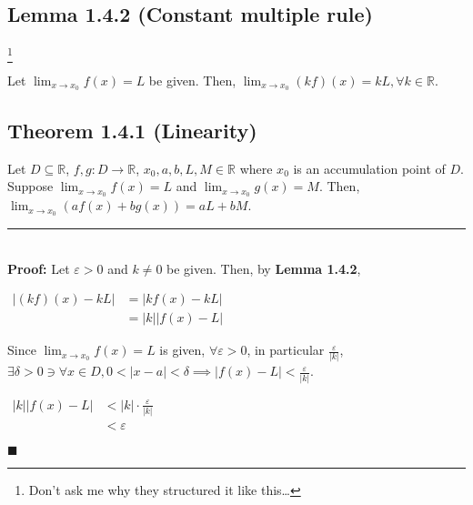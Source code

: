 \documentclass[11pt]{book}
\newcommand{\R}{\mathbb{R}}
\newcommand{\horline}{\noindent\rule{14.25cm}{0.6pt}\\}
\newcommand{\QED}{\begin{flushright}$\blacksquare$\end{flushright}}
\begin{document}
	\subsection{Lemma 1.4.2 (Constant multiple rule)}\footnote{Don't ask me why they structured it like this\dots}
		\begin{lemm}
			Let $\displaystyle\lim_{x \to x_0}{f(x) = L}$ be given. Then, $\displaystyle\lim_{x \to x_0}{(kf)(x) = kL}, \forall k \in \R$.
		\end{lemm}
	\subsection{Theorem 1.4.1 (Linearity)}
		\begin{theor}
			Let $D \subseteq \R$, $f,g: D \to \R$, $x_0, a, b, L, M \in \R$ where $x_0$ is an accumulation point of $D$. Suppose
			$\displaystyle\lim_{x \to x_0}{f(x) = L}$ and $\displaystyle\lim_{x \to x_0}{g(x) = M}$. Then,
			$\displaystyle\lim_{x \to x_0}{(af(x) + bg(x)) = aL + bM}$.\\
			\horline
			\textbf{Proof:} Let $\varepsilon > 0$ and $k \neq 0$ be given. Then, by \textbf{Lemma 1.4.2},
			\begin{center}
				\begin{math}
					\begin{aligned}
						|(kf)(x) -kL| & = |kf(x) - kL|\\
						& = |k||f(x) - L|
					\end{aligned}
				\end{math}
			\end{center}
			Since $\displaystyle\lim_{x \to x_0}{f(x) = L}$ is given, $\forall \varepsilon > 0$, in particular $\frac{\varepsilon}{|k|}$,
			$\exists \delta > 0 \ni \forall x \in D, 0 < |x-a| < \delta \implies |f(x) - L| < \frac{\varepsilon}{|k|}$.
			\begin{center}
				\begin{math}
					\begin{aligned}
						|k||f(x) - L| & < |k| \cdot \frac{\varepsilon}{|k|}\\
						& < \varepsilon
					\end{aligned}
				\end{math}
			\end{center}
			\QED
		\end{theor}
\end{document}

